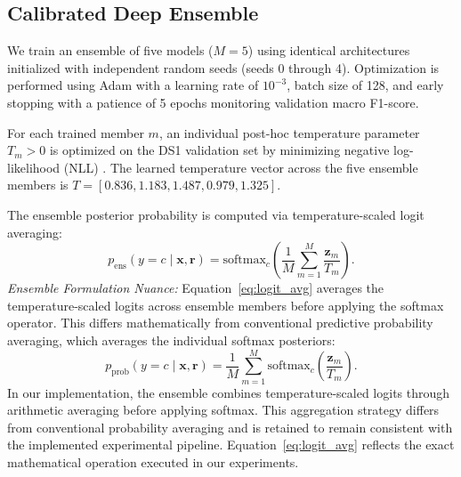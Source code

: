 \documentclass[conference]{IEEEtran}
\begin{document}
\subsection{Calibrated Deep Ensemble}
We train an ensemble of five models ($M=5$) using identical architectures initialized with independent random seeds (seeds 0 through 4). Optimization is performed using Adam \cite{b16} with a learning rate of $10^{-3}$, batch size of 128, and early stopping with a patience of 5 epochs monitoring validation macro F1-score.

For each trained member $m$, an individual post-hoc temperature parameter $T_m > 0$ is optimized on the DS1 validation set by minimizing negative log-likelihood (NLL) \cite{b9}. The learned temperature vector across the five ensemble members is $T = [0.836, 1.183, 1.487, 0.979, 1.325]$.

The ensemble posterior probability is computed via temperature-scaled logit averaging:
\begin{equation}
\label{eq:logit_avg}
p_{\text{ens}}(y = c \mid \mathbf{x}, \mathbf{r}) = \mathrm{softmax}_c\!\left(\frac{1}{M}\sum_{m=1}^M \frac{\mathbf{z}_{m}}{T_m}\right).
\end{equation}
\textit{Ensemble Formulation Nuance:} Equation~\eqref{eq:logit_avg} averages the temperature-scaled logits across ensemble members before applying the softmax operator. This differs mathematically from conventional predictive probability averaging, which averages the individual softmax posteriors:
\begin{equation}
\label{eq:prob_avg}
p_{\text{prob}}(y = c \mid \mathbf{x}, \mathbf{r}) = \frac{1}{M}\sum_{m=1}^M \mathrm{softmax}_c\!\left(\frac{\mathbf{z}_{m}}{T_m}\right).
\end{equation}
In our implementation, the ensemble combines temperature-scaled logits through arithmetic averaging before applying softmax. This aggregation strategy differs from conventional probability averaging and is retained to remain consistent with the implemented experimental pipeline. Equation~\eqref{eq:logit_avg} reflects the exact mathematical operation executed in our experiments.
\end{document}
